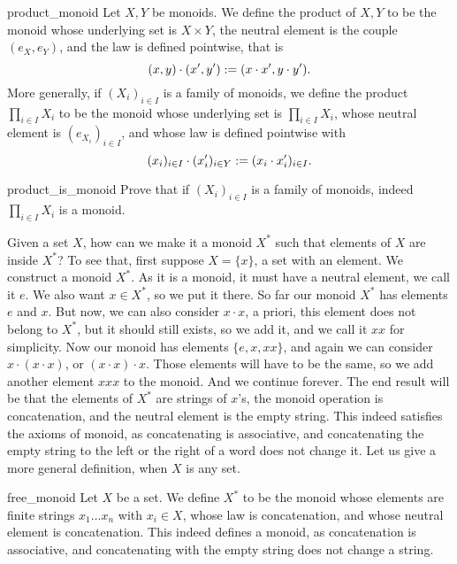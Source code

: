 \begin{cdef}{}{product_monoid}
    Let \( X, Y \) be monoids. We define the product of \( X, Y \) to be the monoid whose underlying set is \( X \times Y \), the neutral element is the couple \( (e_X, e_Y) \), and the law is defined pointwise, that is 
    \begin{equation*}
        (x, y) \cdot (x', y') := (x\cdot x', y \cdot y').
    \end{equation*}
    More generally, if \( (X_i)_{i\in I} \) is a family of monoids, we define the product \( \prod_{i \in I} X_i \) to be the monoid whose underlying set is \( \prod_{i \in I} X_i \), whose neutral element is \( (e_{X_i})_{i \in I} \), and whose law is defined pointwise with
    \begin{equation*}
        (x_i)_{i \in I} \cdot (x'_i)_{i \in Y} := (x_i \cdot x'_i)_{i \in I}.
    \end{equation*}
\end{cdef}

\begin{cex}{}{product_is_monoid}
    Prove that if \( (X_i)_{i\in I} \) is a family of monoids, indeed \( \prod_{i \in I} X_i \) is a monoid.
\end{cex}

Given a set \( X \), how can we make it a monoid \( X^* \) such that elements of \( X \) are inside \( X^* \)? To see that, first suppose \( X = \{ x \} \), a set with an element. We construct a monoid \( X^* \). As it is a monoid, it must have a neutral element, we call it \( e \). We also want \( x \in X^* \), so we put it there. So far our monoid \( X^* \) has elements \( e \) and \( x \). But now, we can also consider \( x\cdot x \), a priori, this element does not belong to \( X^* \), but it should still exists, so we add it, and we call it \( xx \) for simplicity. Now our monoid has elements \( \{ e, x, xx \} \), and again we can consider \( x \cdot (x\cdot x) \), or \( (x \cdot x) \cdot x \). Those elements will have to be the same, so we add another element \( xxx \) to the monoid. And we continue forever. The end result will be that the elements of \( X^* \) are strings of \( x \)'s, the monoid operation is concatenation, and the neutral element is the empty string. This indeed satisfies the axioms of monoid, as concatenating is associative, and concatenating the empty string to the left or the right of a word does not change it. Let us give a more general definition, when \( X \) is any set.

\begin{cdef}{}{free_monoid}
    Let \( X \) be a set. We define \( X^* \) to be the monoid whose elements are finite strings \( x_1 \dots x_n \) with \( x_i \in X \), whose law is concatenation, and whose neutral element is concatenation. This indeed defines a monoid, as concatenation is associative, and concatenating with the empty string does not change a string.
\end{cdef}

